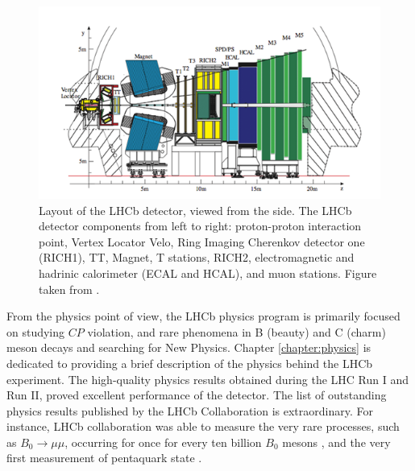 \begin{figure}
\centering
\includegraphics[scale=0.6]{figures/lhcblayout.png}
\caption{Layout of the LHCb detector, viewed from the side. The LHCb detector components from left to right: proton-proton interaction point, Vertex Locator Velo, Ring Imaging Cherenkov detector one (RICH1), TT, Magnet, T stations, RICH2, electromagnetic and hadrinic calorimeter (ECAL and HCAL), and muon stations. Figure taken from \cite{lhcb}. 
\label{fig:LHCBlayout}}
\end{figure}



From the physics point of view, the LHCb physics program is primarily focused on studying $CP$ violation, and rare phenomena in B (beauty) and C (charm) meson decays and searching for New Physics. Chapter \ref{chapter:physics} is dedicated to providing a brief description of the physics behind the LHCb experiment.  
The high-quality physics results obtained during the LHC Run I and Run II, proved excellent performance of the detector.
The list of outstanding physics results published by the LHCb Collaboration is extraordinary. For instance, LHCb collaboration was able to measure the very rare processes, such as $B_0\rightarrow \mu \mu$, occurring for once for every ten billion $B_0$ mesons \cite{B_mumu}, and the very first measurement of pentaquark state \cite{pentaquarks}.  
  
